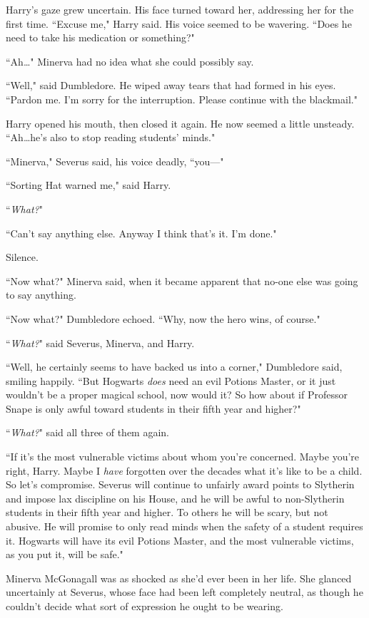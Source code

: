 Harry's gaze grew uncertain. His face turned toward her, addressing her for the first time. ``Excuse me," Harry said. His voice seemed to be wavering. ``Does he need to take his medication or something?"

``Ah…" Minerva had no idea what she could possibly say.

``Well," said Dumbledore. He wiped away tears that had formed in his eyes. ``Pardon me. I'm sorry for the interruption. Please continue with the blackmail."

Harry opened his mouth, then closed it again. He now seemed a little unsteady. ``Ah…he's also to stop reading students' minds."

``Minerva," Severus said, his voice deadly, ``you—"

``Sorting Hat warned me," said Harry.

``\emph{What?}"

``Can't say anything else. Anyway I think that's it. I'm done."

Silence.

``Now what?" Minerva said, when it became apparent that no-one else was going to say anything.

``Now what?" Dumbledore echoed. ``Why, now the hero wins, of course."

``\emph{What?}" said Severus, Minerva, and Harry.

``Well, he certainly seems to have backed us into a corner," Dumbledore said, smiling happily. ``But Hogwarts \emph{does} need an evil Potions Master, or it just wouldn't be a proper magical school, now would it? So how about if Professor Snape is only awful toward students in their fifth year and higher?"

``\emph{What?}" said all three of them again.

``If it's the most vulnerable victims about whom you're concerned. Maybe you're right, Harry. Maybe I \emph{have} forgotten over the decades what it's like to be a child. So let's compromise. Severus will continue to unfairly award points to Slytherin and impose lax discipline on his House, and he will be awful to non-Slytherin students in their fifth year and higher. To others he will be scary, but not abusive. He will promise to only read minds when the safety of a student requires it. Hogwarts will have its evil Potions Master, and the most vulnerable victims, as you put it, will be safe."

Minerva McGonagall was as shocked as she'd ever been in her life. She glanced uncertainly at Severus, whose face had been left completely neutral, as though he couldn't decide what sort of expression he ought to be wearing.

